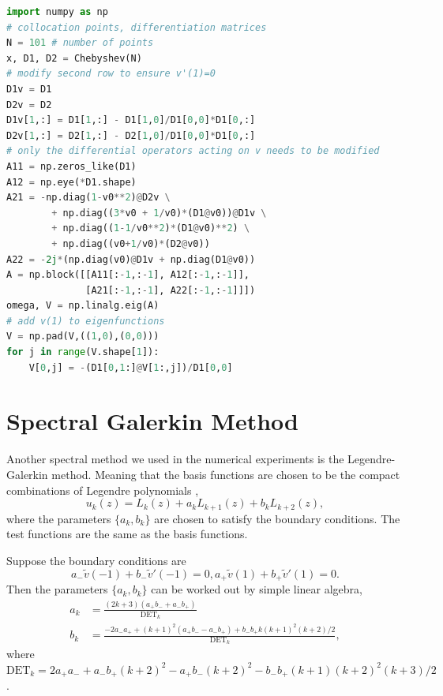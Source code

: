 \begin{lstlisting}[language=Python, float, floatplacement=H, caption={Pseudocode for solving polynomial eigenvalue problem using spectral collocation with fixed-open boundary condition.}, label=code:spectral-collocation-fixed-open]
import numpy as np
# collocation points, differentiation matrices	
N = 101 # number of points
x, D1, D2 = Chebyshev(N)	
# modify second row to ensure v'(1)=0 
D1v = D1
D2v = D2
D1v[1,:] = D1[1,:] - D1[1,0]/D1[0,0]*D1[0,:]
D2v[1,:] = D2[1,:] - D2[1,0]/D1[0,0]*D1[0,:]
# only the differential operators acting on v needs to be modified
A11 = np.zeros_like(D1)
A12 = np.eye(*D1.shape)
A21 = -np.diag(1-v0**2)@D2v \
        + np.diag((3*v0 + 1/v0)*(D1@v0))@D1v \
        + np.diag((1-1/v0**2)*(D1@v0)**2) \
        + np.diag((v0+1/v0)*(D2@v0))
A22 = -2j*(np.diag(v0)@D1v + np.diag(D1@v0))
A = np.block([[A11[:-1,:-1], A12[:-1,:-1]],
              [A21[:-1,:-1], A22[:-1,:-1]]])
omega, V = np.linalg.eig(A)
# add v(1) to eigenfunctions
V = np.pad(V,((1,0),(0,0)))
for j in range(V.shape[1]):
    V[0,j] = -(D1[0,1:]@V[1:,j])/D1[0,0]
\end{lstlisting}


\section{Spectral Galerkin Method}
Another spectral method we used in the numerical experiments is the Legendre-Galerkin method. Meaning that the basis functions are chosen to be the compact combinations of Legendre polynomials \cite{shen_tang_etal_spectral_2011},
\begin{equation}
	u_k(z) = L_k(z) + a_kL_{k+1}(z) + b_kL_{k+2}(z),
\end{equation}
where the parameters $\{a_k,b_k\}$ are chosen to satisfy the boundary conditions. The test functions are the same as the basis functions.

Suppose the boundary conditions are
\[ a_{-}\tilde{v}(-1) + b_{-}\tilde{v}'(-1) = 0, a_{+}\tilde{v}(1) + b_{+}\tilde{v}'(1) = 0.  \]
Then the parameters $\{a_k,b_k\}$ can be worked out by simple linear algebra,
\begin{equation}
	\begin{aligned}
		a_k & = \frac{(2k+3)(a_{+}b_{-} + a_{-}b_{+})}{\text{DET}_k}                                              \\
		b_k & = \frac{-2a_{-}a_{+} + (k+1)^2(a_{+}b_{-} - a_{-}b_{+}) + b_{-}b_{+}k(k+1)^2(k+2)/2}{\text{DET}_k},
	\end{aligned}
\end{equation}
where $\text{DET}_k = 2a_{+}a_{-} + a_{-}b_{+}(k+2)^2 - a_{+}b_{-}(k+2)^2 - b_{-}b_{+}(k+1)(k+2)^2(k+3)/2$.

